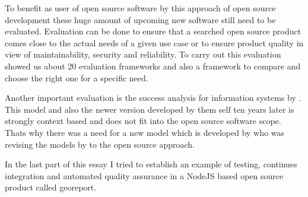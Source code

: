 \documentclass[DIV=calc,paper=a4,fontsize=9pt,twocolumn]{scrartcl}
\begin{document}
To benefit as user of open source software by this approach of open source development these huge amount of upcoming new software still need to be evaluated. Evaluation can be done to ensure that a searched open source product comes close to the actual needs of a given use case or to ensure product quality in view of maintainability, security and reliability. To carry out this evaluation \citet{stol2010comparison} showed us about 20 evaluation frameworks and also a framework to compare and choose the right one for a specific need.

Another important evaluation is the success analysis for information systems by \citet{delone1992information}. This model and also the newer version developed by them self ten years later is strongly context based and does not fit into the open source software scope. Thats why there was a need for a new model which is developed by \citet{lee2009measuring} who was revising the models by \citet{delone1992information} to the open source approach.

In the last part of this essay I tried to establish an example of testing, continues integration and automated quality assurance in a NodeJS based open source product called georeport.


\end{document}
